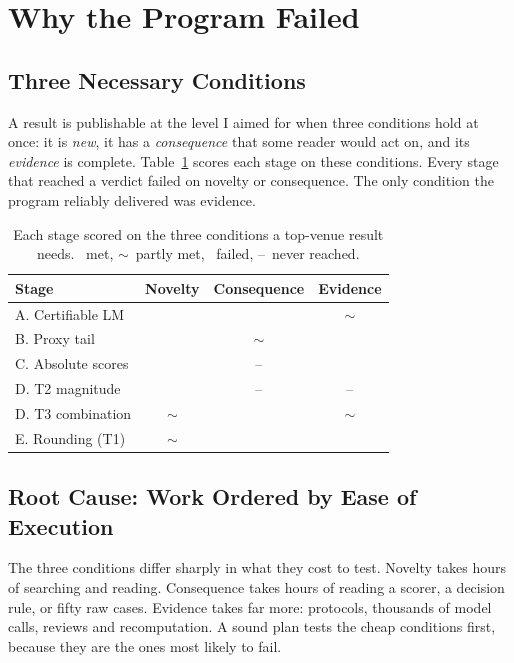\documentclass[11pt]{article}
\newcommand{\yes}{\textcolor{okgreen}{\ding{51}}}
\newcommand{\no}{\textcolor{failred}{\ding{55}}}
\newcommand{\partly}{\textcolor{black!55}{$\sim$}}
\newcommand{\na}{\textcolor{black!40}{--}}
\begin{document}
\section{Why the Program Failed}
\label{sec:why}

\subsection{Three Necessary Conditions}

A result is publishable at the level I aimed for when three conditions hold at once: it is \emph{new}, it has a \emph{consequence} that some reader would act on, and its \emph{evidence} is complete. Table~\ref{tab:factors} scores each stage on these conditions. Every stage that reached a verdict failed on novelty or consequence. The only condition the program reliably delivered was evidence.

\begin{table}[t]
\centering
\small
\setlength{\tabcolsep}{4.5pt}
\begin{tabular}{@{}lccc@{}}
\toprule
\textbf{Stage} & \textbf{Novelty} & \textbf{Consequence} & \textbf{Evidence} \\
\midrule
A. Certifiable LM & \no & \no & \partly \\
B. Proxy tail & \no & \partly & \no \\
C. Absolute scores & \no & \na & \no \\
D. T2 magnitude & \no & \na & \na \\
D. T3 combination & \partly & \no & \partly \\
E. Rounding (T1) & \partly & \no & \yes \\
\bottomrule
\end{tabular}
\caption{Each stage scored on the three conditions a top-venue result needs. \yes\ met, \partly\ partly met, \no\ failed, \na\ never reached.}
\label{tab:factors}
\end{table}

\subsection{Root Cause: Work Ordered by Ease of Execution}

The three conditions differ sharply in what they cost to test. Novelty takes hours of searching and reading. Consequence takes hours of reading a scorer, a decision rule, or fifty raw cases. Evidence takes far more: protocols, thousands of model calls, reviews and recomputation. A sound plan tests the cheap conditions first, because they are the ones most likely to fail.
\end{document}
